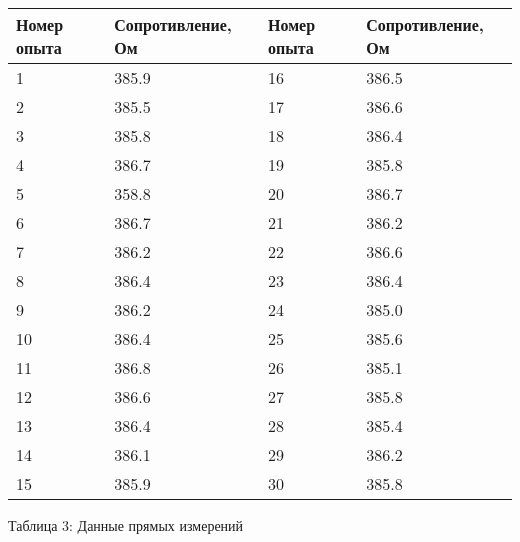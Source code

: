 \documentclass[12pt]{article}
\begin{document}
\begin{enumerate}
\begin{center}
    \begin{tabular}{|l|l|l|l|}
    \hline
        Номер опыта  & Сопротивление, Ом & Номер опыта  & Сопротивление, Ом \\ \hline
        1 & 385.9 & 16 & 386.5 \\ \hline
        2 & 385.5 & 17 & 386.6 \\ \hline
        3 & 385.8 & 18 & 386.4 \\ \hline
        4 & 386.7 & 19 & 385.8 \\ \hline
        5 & 358.8 & 20 & 386.7 \\ \hline
        6 & 386.7 & 21 & 386.2 \\ \hline
        7 & 386.2 & 22 & 386.6 \\ \hline
        8 & 386.4 & 23 & 386.4 \\ \hline
        9 & 386.2 & 24 & 385.0 \\ \hline
        10 & 386.4 & 25 & 385.6 \\ \hline
        11 & 386.8 & 26 & 385.1 \\ \hline
        12 & 386.6 & 27 & 385.8\\ \hline
        13 & 386.4 & 28 & 385.4\\ \hline
        14 & 386.1 & 29 & 386.2\\ \hline
        15 & 385.9 & 30 & 385.8 \\ \hline
    \end{tabular}
\end{center}
    \begin{center}
        Таблица 3: Данные прямых измерений 
       \end{center}


\end{enumerate}
\end{document}

